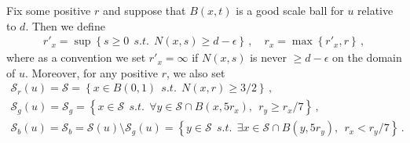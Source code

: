 \documentclass[11pt]{article}
\begin{document}
\begin{definition}
 Fix some positive $r$ and suppose that $B(x,t)$ is a good scale ball for $u$ relative to $d$. Then we define
 \begin{gather}
  r'_x = \sup{\left\{{s\geq 0 \ \ s.t. \ \ N(x,s)\geq d-\epsilon}\right\}}\, , \quad r_x = \max{\left\{{r'_x,r}\right\}}\, ,
 \end{gather}
where as a convention we set $r'_x=\infty$ if $N(x,s)$ is never $\geq d-\epsilon$ on the domain of $u$. Moreover, for any positive $r$, we also set
 \begin{gather}
  {\mathcal{S}}_r(u)={\mathcal{S}}= {\left\{{x\in B(0,1) \ \ s.t. \ \  N(x,r)\geq 3/2}\right\}}\, ,\\
  {\mathcal{S}}_g(u) ={\mathcal{S}}_g= {\left\{{x\in {\mathcal{S}} \ \ s.t. \ \ \forall y \in {\mathcal{S}}\cap B(x,5 r_x), \ \ r_y \geq r_x/7}\right\}}\, ,\\
  {\mathcal{S}}_b(u) ={\mathcal{S}}_b= {\mathcal{S}}(u)\setminus {\mathcal{S}}_g(u) ={\left\{{y\in {\mathcal{S}} \ \ s.t. \ \ \exists x \in {\mathcal{S}}\cap B(y,5 r_y), \ \ r_x < r_y/7}\right\}}\, .
 \end{gather}
\end{definition}
\end{document}
